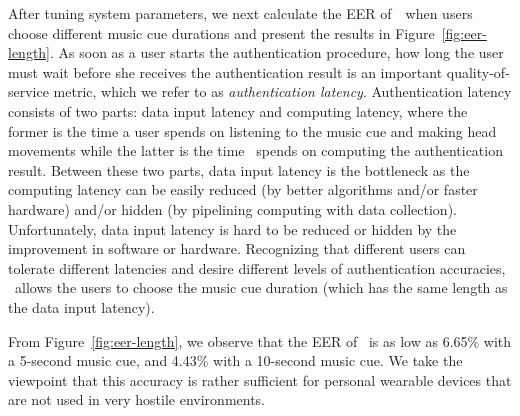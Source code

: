 
After tuning system parameters, we next calculate the EER of~\systemname~when users choose different music cue durations and present the results in Figure~\ref{fig:eer-length}. As soon as a user starts the authentication procedure, how long the user must wait before she receives the authentication result is an important quality-of-service metric, which we refer to as \emph{authentication latency}.  Authentication latency consists of two parts: data input latency and computing latency, where the former is the time a user spends on listening to the music cue and making head movements while the latter is the time \systemname~spends on computing the authentication result. Between these two parts, data input latency is the bottleneck as the computing latency can be easily reduced (by better algorithms and/or faster hardware) and/or hidden (by pipelining computing with data collection). Unfortunately, data input latency is hard to be reduced or hidden by the improvement in software or hardware. Recognizing that different users can tolerate different latencies and desire different levels of authentication accuracies, \systemname~allows the users to choose the music cue duration (which has the same length as the data input latency).

From Figure~\ref{fig:eer-length}, we observe that the EER of \systemname~is as low as 6.65\% with a 5-second music cue, and 4.43\% with a 10-second music cue. We take the viewpoint that this accuracy is rather sufficient for personal wearable devices that are not used in very hostile environments.
%

